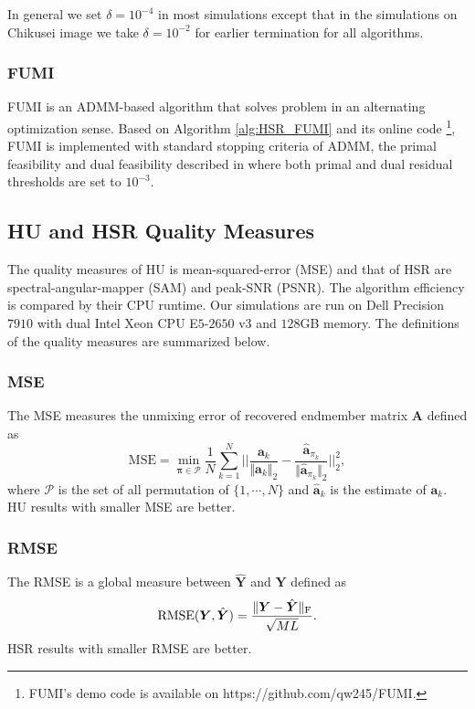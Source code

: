 In general we set $\delta = 10^{-4}$ in most simulations except that in the
simulations on Chikusei image we take $\delta = 10^{-2}$ for earlier
termination for all algorithms.

\subsubsection{FUMI}
FUMI
\cite{FUMI}
is an ADMM-based algorithm that solves problem in an alternating optimization
sense.
Based on Algorithm \ref{alg:HSR_FUMI} and its online code
\footnote{FUMI's demo code is available on https://github.com/qw245/FUMI.},
FUMI is implemented with standard stopping criteria of ADMM, \ie the primal
feasibility and dual feasibility described in
\cite{ADMM_BOYD2011}
where both primal and dual residual thresholds are set to $10^{-3}$.

\subsection{HU and HSR Quality Measures} \label{sec:Quality_Measures}
The quality measures of HU is mean-squared-error (MSE) and that of HSR are
spectral-angular-mapper (SAM) and peak-SNR (PSNR).
The algorithm efficiency is compared by their CPU runtime.
Our simulations are run on Dell Precision $7910$ with dual Intel Xeon CPU
E$5$-$2650$ v$3$ and $128$GB memory.
The definitions of the quality measures are summarized below.

\subsubsection{MSE}
The MSE measures the unmixing error of recovered endmember matrix $\bm A$
defined as
\[%
    \text{MSE} = \underset{\bm \pi \in \mathcal P}{\min}
    \frac{1}{N} \sum_{k=1}^{N}
    \big|\big| \frac{\bm a_k}            {\Vert \bm a_k             \Vert_2} -
               \frac{\hat{\bm a}_{\pi_k}}{\Vert \hat{\bm a}_{\pi_k} \Vert_2}
    \big|\big|_2^2,
\]%
where $\mathcal P$ is the set of all permutation of $\{1,\cdots,N\}$ and
$\hat{\bm a}_k$ is the estimate of $\bm a_k$.
HU results with smaller MSE are better.

\subsubsection{RMSE}
The RMSE is a global measure between $\hat{\bm Y}$ and $\bm Y$ defined as
\[%
    \text{RMSE}(\bm Y,\hat{\bm Y}) = \frac{\Vert \bm Y - \hat{\bm Y} \Vert\Fr}
                                          {\sqrt{ML}}.
\]%
HSR results with smaller RMSE are better.

